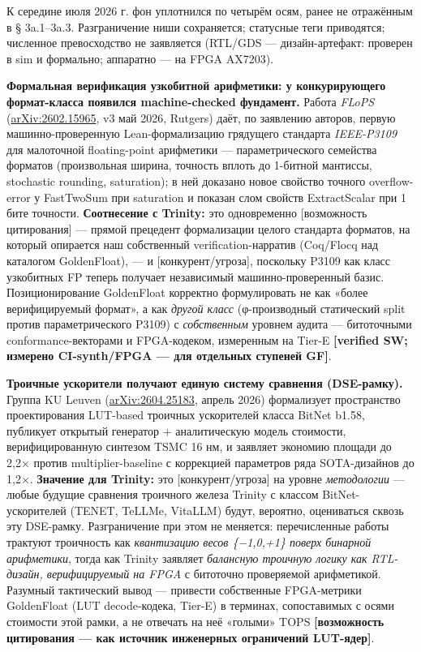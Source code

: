 \documentclass[
  russian,
]{article}
\begin{document}
К середине июля 2026 г. фон уплотнился по четырём осям, ранее не
отражённым в § 3a.1--3a.3. Разграничение ниши сохраняется; статусные
теги приводятся; численное превосходство не заявляется (RTL/GDS
— дизайн-артефакт: проверен в sim и формально; аппаратно — на FPGA AX7203).

\textbf{Формальная верификация узкобитной арифметики: у конкурирующего
формат-класса появился machine-checked фундамент.} Работа \emph{FLoPS}
(\href{https://arxiv.org/abs/2602.15965}{arXiv:2602.15965}, v3 май 2026,
Rutgers) даёт, по заявлению авторов, первую машинно-проверенную
Lean-формализацию грядущего стандарта \emph{IEEE-P3109} для малоточной
floating-point арифметики --- параметрического семейства форматов
(произвольная ширина, точность вплоть до 1-битной мантиссы, stochastic
rounding, saturation); в ней доказано новое свойство точного
overflow-error у FastTwoSum при saturation и показан слом свойств
ExtractScalar при 1 бите точности. \textbf{Соотнесение с Trinity:} это
одновременно {[}возможность цитирования{]} --- прямой прецедент
формализации целого стандарта форматов, на который опирается наш
собственный verification-нарратив (Coq/Flocq над каталогом GoldenFloat),
--- и {[}конкурент/угроза{]}, поскольку P3109 как класс узкобитных FP
теперь получает независимый машинно-проверенный базис. Позиционирование
GoldenFloat корректно формулировать не как «более верифицируемый
формат», а как \emph{другой класс} (φ-производный статический split
против параметрического P3109) с \emph{собственным} уровнем аудита ---
битоточными conformance-векторами и FPGA-кодеком, измеренным на Tier-E
\textbf{{[}verified SW; измерено CI-synth/FPGA --- для отдельных
ступеней GF{]}}.

\textbf{Троичные ускорители получают единую систему сравнения
(DSE-рамку).} Группа KU Leuven
(\href{https://arxiv.org/abs/2604.25183}{arXiv:2604.25183}, апрель 2026)
формализует пространство проектирования LUT-based троичных ускорителей
класса BitNet b1.58, публикует открытый генератор + аналитическую модель
стоимости, верифицированную синтезом TSMC 16 нм, и заявляет экономию
площади до 2,2× против multiplier-baseline с коррекцией параметров ряда
SOTA-дизайнов до 1,2×. \textbf{Значение для Trinity:} это
{[}конкурент/угроза{]} на уровне \emph{методологии} --- любые будущие
сравнения троичного железа Trinity с классом BitNet-ускорителей (TENET,
TeLLMe, VitaLLM) будут, вероятно, оцениваться сквозь эту DSE-рамку.
Разграничение при этом не меняется: перечисленные работы трактуют
троичность как \emph{квантизацию весов \{−1,0,+1\} поверх бинарной
арифметики}, тогда как Trinity заявляет \emph{балансную троичную логику
как RTL-дизайн, верифицируемый на FPGA} с битоточно проверяемой арифметикой. Разумный
тактический вывод --- привести собственные FPGA-метрики GoldenFloat (LUT
decode-кодека, Tier-E) в терминах, сопоставимых с осями стоимости этой
рамки, а не отвечать на неё «голыми» TOPS \textbf{{[}возможность
цитирования --- как источник инженерных ограничений LUT-ядер{]}}.
\end{document}
